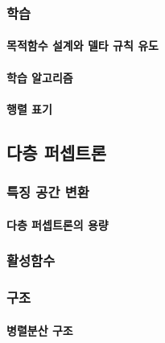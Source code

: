 \documentclass [12pt] {oblivoir}
\let\oldsubsubsection=\subsubsection
\renewcommand{\subsubsection}
{
  \filbreak
  \oldsubsubsection
}
\begin{document}
\vspace{3mm}

\subsubsection{학습}

\paragraph*{목적함수 설계와 델타 규칙 유도}\mbox{}

\vspace{3mm}

\paragraph*{학습 알고리즘}\mbox{}

\vspace{3mm}

\paragraph*{행렬 표기}\mbox{}

\vspace{3mm}

\subsection{다층 퍼셉트론}

\subsubsection{특징 공간 변환}

\paragraph*{다층 퍼셉트론의 용량}\mbox{}

\vspace{3mm}

\subsubsection{활성함수}

\subsubsection{구조}

\paragraph*{병렬분산 구조}\mbox{}
\end{document}
